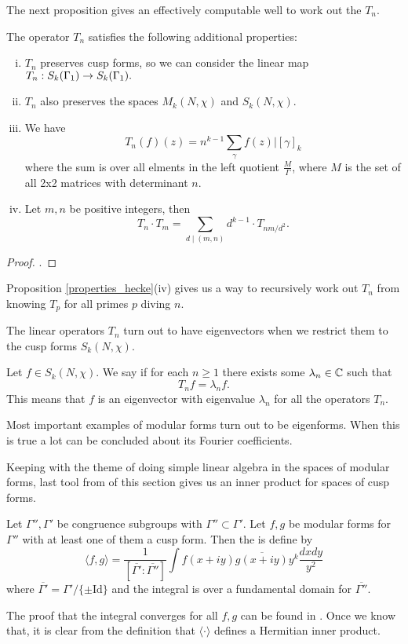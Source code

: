 \documentclass[12pt, a4paper]{report}
\begin{document}
The next proposition gives an effectively computable well to work out the $T_n$. 

\begin{prop} \label{properties_hecke}
The operator $T_n$ satisfies the following additional properties:
  \begin{enumerate}[(i)]
  \item $T_n$ preserves cusp forms, so we can consider the linear map $T_n :
    S_k(\Gamma_1) \rightarrow S_k(\Gamma_1).$ 
  \item $T_n$ also preserves the spaces $M_k(N, \chi)$ and $S_k(N, \chi).$
  \item We have
    \[T_n(f)(z) = n^{k-1} \sum\limits_\gamma f(z) | [\gamma]_k \]
    where the sum is over all elments in the left quotient $\frac{M}{\Gamma}$,
    where $M$ is the set of all 2x2 matrices with determinant $n$.
  \item Let $m, n$ be positive integers, then
    \[T_n \cdot T_m = \sum\limits_{d \mid (m,n)} d^{k-1} \cdot T_{nm/d^2}.\]
  \end{enumerate}
\end{prop}
\begin{proof}
  \cite[Section 4.1.2, Pages 61-64]{modular}.
\end{proof}
Proposition \autoref{properties_hecke}(iv) gives us a way to recursively work out
$T_n$ from knowing $T_p$ for all primes $p$ diving $n$.

The linear operators $T_n$ turn out to have eigenvectors when we restrict them
to the cusp forms $S_k(N, \chi).$

\begin{defn}
  Let $f \in S_k(N, \chi).$ We say  if for each $n
  \geq 1$ there exists some $\lambda_n \in {\mathbb C}$ such that
  \[T_n f = \lambda_n f.\]
  This means that $f$ is an eigenvector with eigenvalue $\lambda_n$ for all the
  operators $T_n.$
\end{defn}

Most important examples of modular forms turn out to be eigenforms. When this is
true a lot can be concluded about its Fourier coefficients. 

Keeping with the theme of doing simple linear algebra in the spaces of modular
forms, last tool from of this section gives us an inner product for spaces
of cusp forms.

\begin{defn}
  Let $\Gamma'', \Gamma'$ be congruence subgroups with $\Gamma'' \subset
  \Gamma'$.
  Let $f, g$ be modular forms for $\Gamma''$ with at least one of them a cusp
  form. Then the  is define by
  \[\langle f,g \rangle = \frac{1}{[\overline{\Gamma'} : \overline{\Gamma''}]}
  \int f(x+iy) \overline{g(x+iy)} y^k \frac{dx dy}{y^2}\]
  where $\overline{\Gamma'} = \Gamma' / \{ \pm\text{Id}\}$ and the integral is over
  a fundamental domain for $\overline{\Gamma''}$.

  The proof that the integral converges for all $f, g$ can be found in
  \cite[Chapter III-5, page 170]{koblitz}. Once we know that, it is clear from
  the definition that $\langle \cdot \rangle$ defines a Hermitian inner product.
\end{defn}
\end{document}

